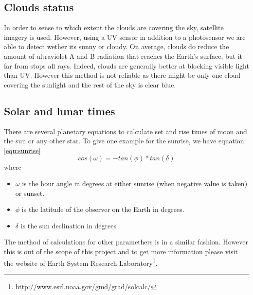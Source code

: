 \subsection{Clouds status}
In order to sense to which extent the clouds are covering the sky, satellite imagery is used. However, using a UV sensor in addition to a photosensor we are able to
detect wether its sunny or cloudy. On average, clouds do reduce the amount of ultraviolet A and B radiation that reaches the Earth's surface, but it far from stops all rays. Indeed, clouds are generally better at blocking visible light than UV.
However this method is not reliable as there might be only one cloud covering the sunlight and the rest of the sky is clear blue.

\subsection{Solar and lunar times}
There are several planetary equations to calculate set and rise times of moon and the sun or any other star.
To give one example for the sunrise, we have equation \ref{equ:sunrise}
\begin{equation}
  cos(\omega) = -tan(\phi) * tan (\delta)
  \label{equ:sunrise}
\end{equation}
where
\begin{itemize}
  \item $\omega$ is the hour angle in degrees at either sunrise (when negative value is taken) or sunset.
  \item $\phi$ is the latitude of the observer on the Earth in degrees.
  \item $\delta$ is the sun declination in degrees
\end{itemize}

The method of calculations for other paramethers is in a similar fashion. However this is out of the scope of this project and
to get more information please visit the website of Earth System Research Laboratory\footnote{http://www.esrl.noaa.gov/gmd/grad/solcalc/}.
